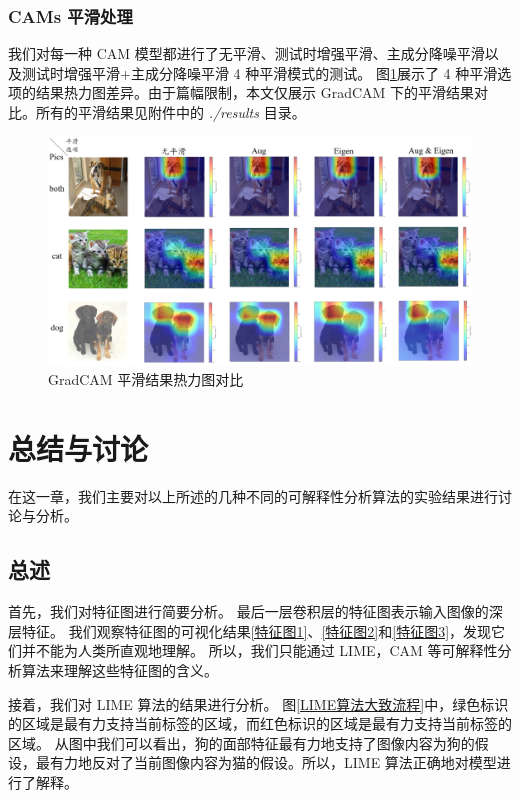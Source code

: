 \documentclass[supercite]{Experimental_Report}
\theoremstyle{definition}
\begin{document}
\subsubsection{CAMs 平滑处理}
我们对每一种 CAM 模型都进行了无平滑、测试时增强平滑、主成分降噪平滑以及测试时增强平滑+主成分降噪平滑 4 种平滑模式的测试。
图\ref{平滑对比}展示了 4 种平滑选项的结果热力图差异。由于篇幅限制，本文仅展示 GradCAM 下的平滑结果对比。所有的平滑结果见附件中的 \emph{./results} 目录。
\begin{figure}[H]
	\begin{center}
		\includegraphics[scale=0.45]{../images/平滑对比.png}
		\caption{GradCAM 平滑结果热力图对比}
		\label{平滑对比}
	\end{center}
\end{figure}

\section{总结与讨论}
在这一章，我们主要对以上所述的几种不同的可解释性分析算法的实验结果进行讨论与分析。
\subsection{总述}
首先，我们对特征图进行简要分析。
最后一层卷积层的特征图表示输入图像的深层特征。
我们观察特征图的可视化结果\ref{特征图1}、\ref{特征图2}和\ref{特征图3}，发现它们并不能为人类所直观地理解。
所以，我们只能通过 LIME，CAM 等可解释性分析算法来理解这些特征图的含义。

接着，我们对 LIME 算法的结果进行分析。
图\ref{LIME算法大致流程}中，绿色标识的区域是最有力支持当前标签的区域，而红色标识的区域是最有力支持当前标签的区域。
从图中我们可以看出，狗的面部特征最有力地支持了图像内容为狗的假设，最有力地反对了当前图像内容为猫的假设。所以，LIME 算法正确地对模型进行了解释。
\end{document}
